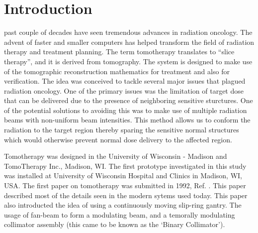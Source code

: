\documentclass[12pt,journal,compsoc]{IEEEtran} %
\begin{document}
  \section{Introduction}
	 past couple of decades have seen tremendous advances in 
	radiation oncology. The advent of faster and smaller computers has helped 
	transform the field of radiation therapy and treatment planning. The term 
	tomotherapy translates to ``slice therapy'', and it is derived from 
	tomography. The system is designed to make use of the tomographic 
	reconstruction mathematics for treatment and also for verification. The idea 
	was conceived to tackle several major issues that plagued radiation oncology. 
	One of the primary issues was the limitation of target dose that can be 
	delivered due to the presence of neighboring sensitive sturctures. One of the 
	potential solutions to avoiding this was to make use of multiple radiation 
	beams with non-uniform beam intensities. This method allows us to conform the 
	radiation to the target region thereby sparing the sensitive normal 
	structures which would otherwise prevent normal dose delivery to the affected 
	region.
  
  Tomotherapy was designed in the University of Wisconsin - Madison and 
  TomoTherapy Inc., Madison, WI. The first prototype investigated in this study 
  was installed at University of Wisconsin Hospital and Clinics in Madison, WI, 
  USA. The first paper on tomotherapy was submitted in 1992, Ref. 
  \cite{Mackie1993}. This paper described most of the details seen in the 
  modern sytems used today. This paper also introducted the idea of using a 
  continuously moving slip-ring gantry. The usage of fan-beam to form a 
  modulating beam, and a temorally modulating collimator assembly (this came 
  to be known as the `Binary Collimator').
  
\end{document}
